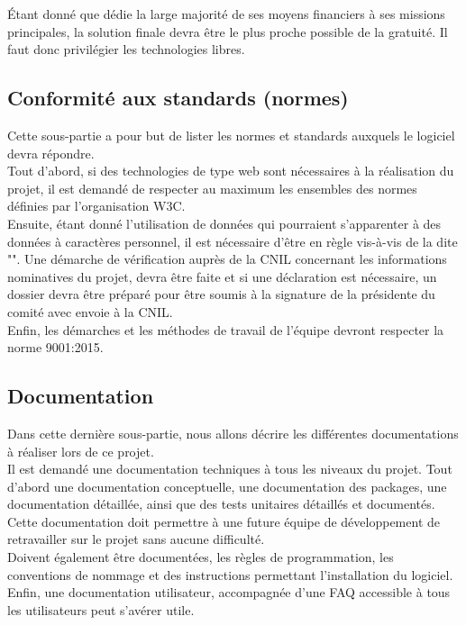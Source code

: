 Étant donné que \nomClient{} dédie la large majorité de ses moyens financiers à ses missions principales, la solution finale devra être le plus proche possible de la gratuité. Il faut donc privilégier les technologies libres.


\subsection{Conformité aux standards (normes)}
Cette sous-partie a pour but de lister les normes et standards auxquels le logiciel devra répondre.\\

Tout d'abord, si des technologies de type web sont nécessaires à la réalisation du projet, il est demandé de respecter au maximum les ensembles des normes définies par l'organisation W3C.\\

Ensuite, étant donné l'utilisation de données qui pourraient s'apparenter à des données à caractères personnel, il est nécessaire d'être en règle vis-à-vis de la \loiInfoLib{} dite "\loiInfoLibCourt{}". Une démarche de vérification auprès de la CNIL concernant les informations nominatives du projet, devra être faite et si une déclaration est nécessaire, un dossier devra être préparé pour être soumis à la signature de la présidente du comité avec envoie à la CNIL.\\

Enfin, les démarches et les méthodes de travail de l'équipe \PICCourt{} devront respecter la norme \ISOCourt{} 9001:2015.

\subsection{Documentation}
\label{doc}
Dans cette dernière sous-partie, nous allons décrire les différentes documentations à réaliser lors de ce projet.\\

Il est demandé une documentation techniques à tous les niveaux du projet. Tout d'abord une documentation conceptuelle, une documentation des packages, une documentation détaillée, ainsi que des tests unitaires détaillés et documentés. Cette documentation doit permettre à une future équipe de développement de retravailler sur le projet sans aucune difficulté.\\

Doivent également être documentées, les règles de programmation, les conventions de nommage et des instructions permettant l'installation du logiciel.\\

Enfin, une documentation utilisateur, accompagnée d'une FAQ accessible à tous les utilisateurs peut s'avérer utile.
